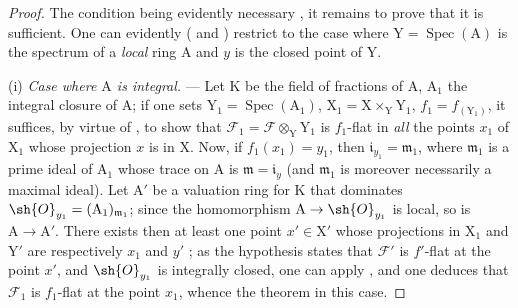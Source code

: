 \begin{proof}
The condition being evidently necessary , it remains to prove that it is sufficient.
One can evidently ( and ) restrict to the case where $\mathrm{Y}=\operatorname{Spec}(\mathrm{A})$ is the spectrum of a \emph{local} ring $\mathrm{A}$ and $y$ is the closed point of $\mathrm{Y}$.
\medskip

(i) \emph{Case where $\mathrm{A}$ is integral.} --- Let $\mathrm{K}$ be the field of fractions of $\mathrm{A}$, $\mathrm{A}_1$ the integral closure of $\mathrm{A}$; if one sets $\mathrm{Y}_1=\operatorname{Spec}(\mathrm{A}_1)$, $\mathrm{X}_1=\mathrm{X}\times_\mathrm{Y}\mathrm{Y}_1$, $f_1=f_{(\mathrm{Y}_1)}$, it suffices, by virtue of , to show that $\mathscr{F}_1=\mathscr{F}\otimes_\mathrm{Y}\mathrm{Y}_1$ is $f_1$-flat in \emph{all} the points $x_1$ of $\mathrm{X}_1$ whose projection $x$ is in $\mathrm{X}$.
Now, if $f_1(x_1)=y_1$, then $\mathfrak{i}_{y_1}=\mathfrak{m}_1$, where $\mathfrak{m}_1$ is a prime ideal of $\mathrm{A}_1$ whose trace on $\mathrm{A}$ is $\mathfrak{m}=\mathfrak{i}_y$ (and $\mathfrak{m}_1$ is moreover necessarily a maximal ideal). Let $\mathrm{A}'$ be a valuation ring for $\mathrm{K}$ that dominates $\sh{O}_{y_1}=(\mathrm{A}_1)_{\mathfrak{m}_1}$; since the homomorphism $\mathrm{A}\to\sh{O}_{y_1}$ is local, so is $\mathrm{A}\to\mathrm{A}'$.
There exists then at least one
point $x'\in\mathrm{X}'$ whose projections in $\mathrm{X}_1$ and $\mathrm{Y}'$ are respectively $x_1$ and $y'$ ; as the hypothesis states that $\mathscr{F}'$ is $f'$-flat at the point $x'$, and $\sh{O}_{y_1}$ is integrally closed, one can apply , and one deduces that $\mathscr{F}_1$ is $f_1$-flat at the point $x_1$, whence the theorem in this case.
\medskip


\end{proof}

